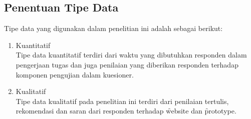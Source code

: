\subsection{Penentuan Tipe Data}
Tipe data yang digunakan dalam penelitian ini adalah sebagai berikut:
\begin{enumerate}
	\item Kuantitatif\\
	Tipe data kuantitatif terdiri dari waktu yang dibutuhkan responden dalam pengerjaan tugas dan juga penilaian yang diberikan responden terhadap komponen pengujian dalam kuesioner.
	\item Kualitatif\\
	Tipe data kualitatif pada penelitian ini terdiri dari penilaian tertulis, rekomendasi dan saran dari responden terhadap \f{website} dan \f{prototype}.
\end{enumerate}
